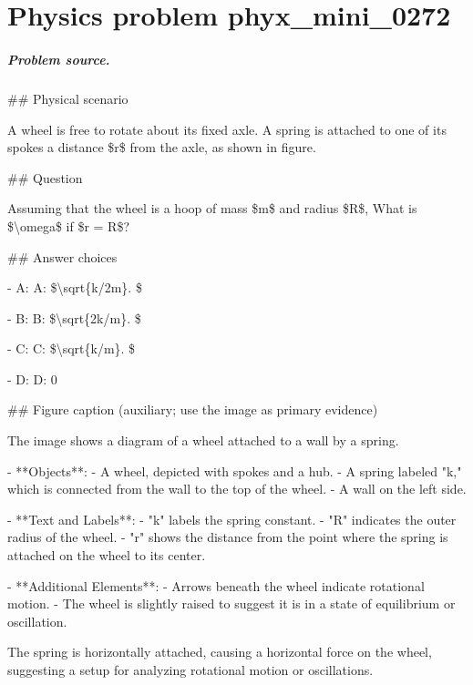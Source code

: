 
\chapter{Physics problem phyx\_mini\_0272}
\label{ch:PhyXMiniProblems_problem_phyx_mini_0272}

\paragraph{Problem source.}
\#\# Physical scenario

A wheel is free to rotate about its fixed axle. A spring is attached to one of its spokes a distance \$r\$ from the axle, as shown in figure.

\#\# Question

Assuming that the wheel is a hoop of mass \$m\$ and radius \$R\$, What is \$\textbackslash{}omega\$ if \$r = R\$?

\#\# Answer choices

- A: A: \$\textbackslash{}sqrt\{k/2m\}. \$

- B: B: \$\textbackslash{}sqrt\{2k/m\}. \$

- C: C: \$\textbackslash{}sqrt\{k/m\}. \$

- D: D: 0

\#\# Figure caption (auxiliary; use the image as primary evidence)

The image shows a diagram of a wheel attached to a wall by a spring. 

- **Objects**: 
  - A wheel, depicted with spokes and a hub.
  - A spring labeled "k," which is connected from the wall to the top of the wheel.
  - A wall on the left side.

- **Text and Labels**:
  - "k" labels the spring constant.
  - "R" indicates the outer radius of the wheel.
  - "r" shows the distance from the point where the spring is attached on the wheel to its center.

- **Additional Elements**:
  - Arrows beneath the wheel indicate rotational motion.
  - The wheel is slightly raised to suggest it is in a state of equilibrium or oscillation.

The spring is horizontally attached, causing a horizontal force on the wheel, suggesting a setup for analyzing rotational motion or oscillations.

